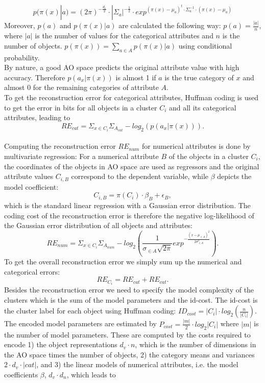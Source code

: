 \documentclass[conference]{IEEEtran}
\begin{document}
\begin{equation*}
p(\pi(x)|a) = (2\pi)^{-\frac{d_v}{2}} \cdot |\Sigma_a|^{-\frac{1}{2}} \cdot exp^{(\pi(x)-\mu_a)^{t} \cdot \Sigma_a^{-1} \cdot (\pi(x) - \mu_a)} 
\end{equation*}
Moreover, $p(a)$  and $p(\pi(x)|a)$ are calculated the following way:
$p(a) = \frac{|a|}{n}$, where $|a|$ is the number of values for the categorical attributes and $n$ is the number of objects. 
$p(\pi(x)) = \sum_{a \in A} {p(\pi(x)|a)}$ using conditional probability.
\\
By nature, a good AO space predicts the original attribute value with high accuracy. Therefore $p(a_x|\pi(x))$ is almost 1 if $a$ is the true category of $x$ and almost 0 for the remaining categories of attribute $A$. 
\\
To get the reconstruction error for categorical attributes, Huffman coding is used to get the error in bits for all objects in a cluster $C_i$ and all its categorical attributes, leading to
\begin{equation*}
RE_{cat} = \Sigma_{x \in C_i} \Sigma_{A_{cat}} -log_2(p(a_x|\pi(x))).
\end{equation*}
\\
Computing the reconstruction error $RE_{num}$ for numerical attributes is done by multivariate regression: For a numerical attribute $B$ of the objects in a cluster $C_i$, the coordinates of the objects in AO space are used as regressors and the original attribute values $C_{i,B}$ correspond to the dependent variable, while $\beta$ depicts the model coefficient:
\begin{equation*}
C_{i,B} = \pi(C_i) \cdot \beta_B + \epsilon_B,
\end{equation*}
which is the standard linear regression with a Gaussian error distribution. 
The coding cost of the reconstruction error is therefore the negative log-likelihood of the Gaussian error distribution of all objects and attributes:
\begin{equation*}
RE_{num} = \Sigma_{x \in C_i} \Sigma_{A_{num}} -log_2(\frac{1}{\sigma _{\in A} \sqrt{2\pi}} exp ^{-\frac{(x-\mu_{\in A})^{2}}{2\sigma_{\in A}^{2}}}).
\end{equation*}
To get the overall reconstruction error we simply sum up the numerical and categorical errors:
\begin{equation*}
RE_{C_i} = RE_{cat} + RE_{cat}.
\end{equation*}
Besides the reconstruction error we need to specify the model complexity of the clusters which is the sum of the model parameters and the id-cost. The id-cost is the cluster label for each object using Huffman coding: $ID_{cost} = |C_i| \cdot log_2(\frac {n} {|C_i|})$. The encoded model parameters are estimated by $P_{cost} = \frac{|m|}{2} \cdot log_2|C_i|$ where $|m|$ is the number of model parameters. These are computed by the costs required to encode 1) the object representations $d_v \cdot n$, which is the number of dimensions in the AO space times the number of objects, 2) the category means and variances $2 \cdot d_v \cdot |cat|$, and 3) the linear models of numerical attributes, i.e. the model coefficients $\beta$, $d_v \cdot d_n$, which leads to
\end{document}
